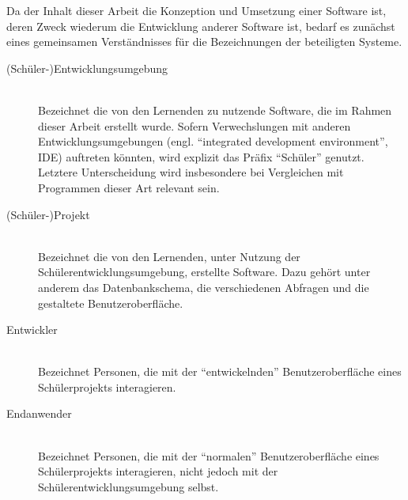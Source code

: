 Da der Inhalt dieser Arbeit die Konzeption und Umsetzung einer Software ist, deren Zweck wiederum die Entwicklung anderer Software ist, bedarf es zunächst eines gemeinsamen Verständnisses für die Bezeichnungen der beteiligten Systeme.

\begin{description}
\item[(Schüler-)Entwicklungsumgebung] \hfill\\ 
  Bezeichnet die von den Lernenden zu nutzende Software, die im Rahmen dieser Arbeit erstellt wurde. Sofern Verwechslungen mit anderen Entwicklungsumgebungen (engl. ``integrated development environment'', IDE) auftreten könnten, wird explizit das Präfix ``Schüler'' genutzt. Letztere Unterscheidung wird insbesondere bei Vergleichen mit Programmen dieser Art relevant sein.
\item[(Schüler-)Projekt] \hfill\\
  Bezeichnet die von den Lernenden, unter Nutzung der Schülerentwicklungsumgebung, erstellte Software. Dazu gehört unter anderem das Datenbankschema, die verschiedenen Abfragen und die gestaltete Benutzeroberfläche.
\item[Entwickler] \hfill\\
  Bezeichnet Personen, die mit der ``entwickelnden'' Benutzeroberfläche eines Schülerprojekts interagieren.
\item[Endanwender] \hfill\\
  Bezeichnet Personen, die mit der ``normalen'' Benutzeroberfläche eines Schülerprojekts interagieren, nicht jedoch mit der Schülerentwicklungsumgebung selbst.
\end{description}
